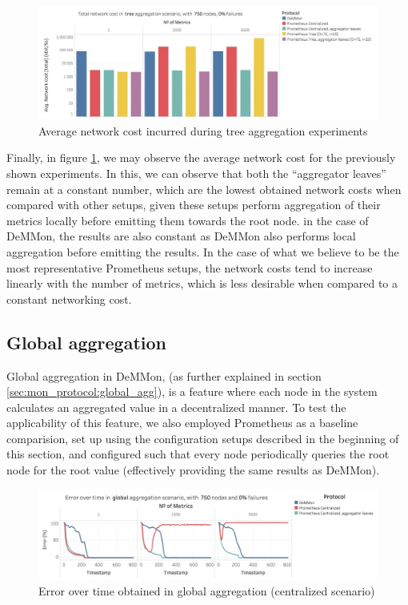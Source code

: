 \begin{figure}
    \centering
    \includegraphics[width=\linewidth]{Chapters/evaluation/figures/aggregation/network_cost_tree.jpg}
    \caption{Average network cost incurred during tree aggregation experiments}
    \label{fig:sec:mon_eval_tree_net_cost}
\end{figure}

Finally, in figure \ref{fig:sec:mon_eval_tree_net_cost}, we may observe the average network cost for the previously shown experiments. In this, we can observe that both the ``aggregator leaves'' remain at a constant number, which are the lowest obtained network costs when compared with other setups, given these setups perform aggregation of their metrics locally before emitting them towards the root node. in the case of DeMMon, the results are also constant as DeMMon also performs local aggregation before emitting the results. In the case of what we believe to be the most representative Prometheus setups, the network costs tend to increase linearly with the number of metrics, which is less desirable when compared to a constant networking cost.

\subsection{Global aggregation}

Global aggregation in DeMMon, (as further explained in section \ref{sec:mon_protocol:global_agg}), is a feature where each node in the system calculates an aggregated value in a decentralized manner. To test the applicability of this feature, we also employed Prometheus as a baseline comparision, set up using the configuration setups described in the beginning of this section, and configured such that every node periodically queries the root node for the root value (effectively providing the same results as DeMMon).

\begin{figure}
    \centering
    \includegraphics[width=\linewidth]{Chapters/evaluation/figures/aggregation/Error_over_time_global_0_failures_centralized.jpg}
    \caption{Error over time obtained in global aggregation (centralized scenario)}
    \label{fig:sec:mon_eval_global_centralized}
\end{figure}

